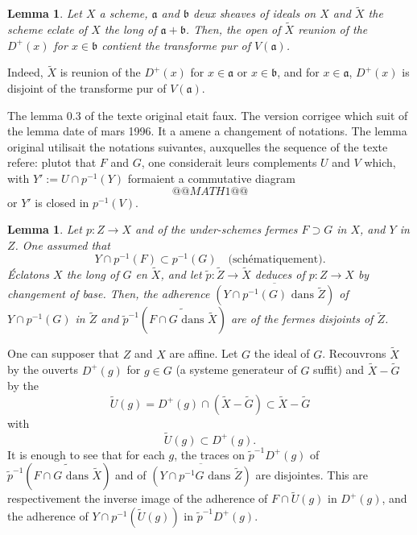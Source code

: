 \documentclass[11pt,a4paper]{article}
\theoremstyle{plain}
\newtheorem{lemma}[theorem]{Lemma}
\theoremstyle{definition}
\begin{document}
\begin{lemma}
Let $X$ a scheme, $\mathfrak{a}$ and $\mathfrak{b}$ deux sheaves of ideals on $X$ and $\widetilde{X}$ the scheme eclate of $X$ the long of $\mathfrak{a}+\mathfrak{b}$. Then, the open of $\widetilde{X}$ reunion of the $D^+(x)$ for $x \in \mathfrak{b}$ contient the transforme pur of $V(\mathfrak{a})$.
\end{lemma}

Indeed, $\widetilde{X}$ is reunion of the $D^+(x)$ for $x \in \mathfrak{a}$ or $x \in \mathfrak{b}$, and for $x \in \mathfrak{a}$, $D^+(x)$ is disjoint of the transforme pur of $V(\mathfrak{a})$.

\bigskip
The lemma 0.3 of the texte original etait faux. The version corrigee which suit of the lemma date of mars 1996. It a amene a changement of notations. The lemma original utilisait the notations suivantes, auxquelles the sequence of the texte refere: plutot that $F$ and $G$, one considerait leurs complements $U$ and $V$ which, with $Y' := U \cap p^{-1}(Y)$ formaient a commutative diagram
\[
@@MATH1@@
\]
or $Y'$ is closed in $p^{-1}(V)$.

\begin{lemma}
Let $p: Z \to X$ and of the under-schemes fermes $F \supset G$ in $X$, and $Y$ in $Z$. One assumed that
\[ Y \cap p^{-1}(F) \subset p^{-1}(G) \quad \text{(sch\'ematiquement).} \]
\'Eclatons $X$ the long of $G$ en $\widetilde{X}$, and let $\tilde{p}: \widetilde{Z} \to \widetilde{X}$ deduces of $p: Z \to X$ by changement of base. Then, the adherence $\overline{(Y \cap p^{-1}(G) \text{ dans } \widetilde{Z})}$ of $Y \cap p^{-1}(G)$ in $\widetilde{Z}$ and $\tilde{p}^{-1}(\widetilde{F \cap G \text{ dans } \widetilde{X}})$ are of the fermes disjoints of $\widetilde{Z}$.
\end{lemma}

One can supposer that $Z$ and $X$ are affine. Let $G$ the ideal of $G$. Recouvrons $\widetilde{X}$ by the ouverts $D^+(g)$ for $g \in G$ (a systeme generateur of $G$ suffit) and $\widetilde{X} - \widetilde{G}$ by the
\[
\widetilde{U}(g) = D^+(g) \cap (\widetilde{X} - \widetilde{G}) \subset \widetilde{X} - \widetilde{G}
\]
with
\[
\widetilde{U}(g) \subset D^+(g).
\]
It is enough to see that for each $g$, the traces on $\tilde{p}^{-1}D^+(g)$ of $\tilde{p}^{-1}(\widetilde{F \cap G \text{ dans } \widetilde{X}})$ and of $\overline{(Y \cap p^{-1}G \text{ dans } \widetilde{Z})}$ are disjointes. This are respectivement the inverse image of the adherence of $F \cap \widetilde{U}(g)$ in $D^+(g)$, and the adherence of $Y \cap p^{-1}(\widetilde{U}(g))$ in $\tilde{p}^{-1}D^+(g)$.
\end{document}

